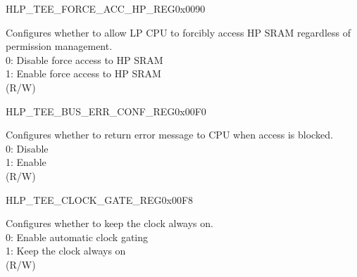 \begin{register}{H}{LP\_TEE\_FORCE\_ACC\_HP\_REG}{0x0090}\label{regdesc:LPTEEFORCEACCHPREG}
%
%
\regnewline%
\begin{regdesc}\begin{reglist}
\label{fielddesc:LPTEEFORCEACCHPMEMEN}\item [LP\_TEE\_FORCE\_ACC\_HPMEM\_EN] Configures whether to allow LP CPU to forcibly access HP SRAM regardless of permission management.\\
0: Disable force access to HP SRAM\\
1: Enable force access to HP SRAM \\ (R/W)
\end{reglist}\end{regdesc}
\end{register}


\begin{register}{H}{LP\_TEE\_BUS\_ERR\_CONF\_REG}{0x00F0}\label{regdesc:LPTEEBUSERRCONFREG}
%
%
\regnewline%
\begin{regdesc}\begin{reglist}
\label{fielddesc:LPTEEBUSERRRESPEN}\item [LP\_TEE\_BUS\_ERR\_RESP\_EN] Configures whether to return error message to CPU when access is blocked.\\
0: Disable\\
1: Enable\\
(R/W)
\end{reglist}\end{regdesc}
\end{register}


\begin{register}{H}{LP\_TEE\_CLOCK\_GATE\_REG}{0x00F8}\label{regdesc:LPTEECLOCKGATEREG}
%
%
\regnewline%
\begin{regdesc}\begin{reglist}
\label{fielddesc:LPTEECLKEN}\item [LP\_TEE\_CLK\_EN] Configures whether to keep the clock always on.\\
0: Enable automatic clock gating \\
1: Keep the clock always on  \\
(R/W)
\end{reglist}\end{regdesc}
\end{register}


